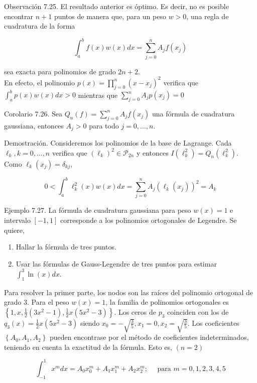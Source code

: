 \documentclass[10pt]{book}
\begin{document}
Observación 7.25. El resultado anterior es óptimo. Es decir, no es posible encontrar $n+1$ puntos de manera que, para un peso $w>0$, una regla de cuadratura de la forma

$$
\int_{a}^{b} f(x) w(x) d x=\sum_{j=0}^{n} A_{j} f\left(x_{j}\right)
$$

sea exacta para polinomios de grado $2 n+2$.\\
En efecto, el polinomio $p(x)=\prod_{j=0}^{n}\left(x-x_{j}\right)^{2}$ verifica que $\int_{a}^{b} p(x) w(x) d x>0$ mientras que $\sum_{j=0}^{n} A_{j} p\left(x_{j}\right)=0$

Corolario 7.26. Sea $Q_{n}(f)=\sum_{j=0}^{n} A_{j} f\left(x_{j}\right)$ una fórmula de cuadratura gaussiana, entonces $A_{j}>0$ para todo $j=0, \ldots, n$.

Demostración. Consideremos los polinomios de la base de Lagrange. Cada $\ell_{k}, k=0, \ldots, n$ verifica que $\left(\ell_{k}\right)^{2} \in \mathcal{P}_{2 n}$ y entonces $I\left(\ell_{k}^{2}\right)=Q_{n}\left(\ell_{k}^{2}\right)$. Como $\ell_{k}\left(x_{j}\right)=\delta_{k j}$,

$$
0<\int_{a}^{b} \ell_{k}^{2}(x) w(x) d x=\sum_{j=0}^{n} A_{j}\left(\ell_{k}\left(x_{j}\right)\right)^{2}=A_{k}
$$

Ejemplo 7.27. La fórmula de cuadratura gaussiana para peso $w(x)=1$ e intervalo $[-1,1]$ corresponde a los polinomios ortogonales de Legendre. Se quiere,

\begin{enumerate}
  \item Hallar la fórmula de tres puntos.
  \item Usar las fórmulas de Gauss-Legendre de tres puntos para estimar $\int_{1}^{3} \ln (x) d x$.
\end{enumerate}

Para resolver la primer parte, los nodos son las raíces del polinomio ortogonal de grado 3. Para el peso $w(x)=1$, la familia de polinomios ortogonales es $\left\{1, x, \frac{1}{2}\left(3 x^{2}-1\right), \frac{1}{2} x\left(5 x^{2}-3\right)\right\}$. Los ceros de $p_{3}$ coinciden con los de $q_{3}(x)=\frac{1}{2} x\left(5 x^{2}-3\right)$ siendo $x_{0}=-\sqrt{\frac{3}{5}}, x_{1}=0, x_{2}=\sqrt{\frac{3}{5}}$. Los coeficientes $\left\{A_{0}, A_{1}, A_{2}\right\}$ pueden encontrase por el método de coeficientes indeterminados, teniendo en cuenta la exactitud de la fórmula. Esto es, $(n=2)$

$$
\int_{-1}^{1} x^{m} d x=A_{0} x_{0}^{m}+A_{1} x_{1}^{m}+A_{2} x_{2}^{m} ; \quad \text { para } m=0,1,2,3,4,5
$$
\end{document}
